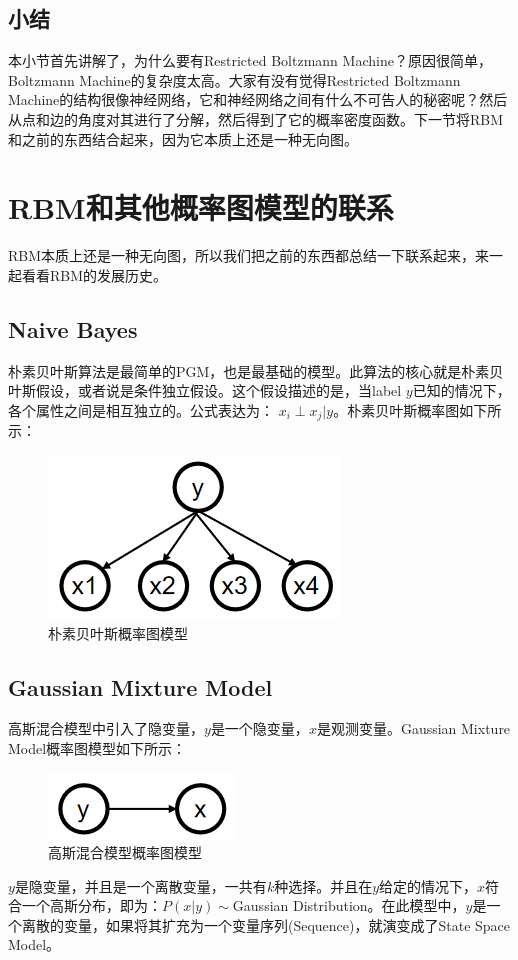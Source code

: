 \documentclass[a4paper]{article}
\begin{document}
\subsection{小结}
本小节首先讲解了，为什么要有Restricted Boltzmann Machine？原因很简单，Boltzmann Machine的复杂度太高。大家有没有觉得Restricted Boltzmann Machine的结构很像神经网络，它和神经网络之间有什么不可告人的秘密呢？然后从点和边的角度对其进行了分解，然后得到了它的概率密度函数。下一节将RBM和之前的东西结合起来，因为它本质上还是一种无向图。

\section{RBM和其他概率图模型的联系}
RBM本质上还是一种无向图，所以我们把之前的东西都总结一下联系起来，来一起看看RBM的发展历史。

\subsection{Naive Bayes}
朴素贝叶斯算法是最简单的PGM，也是最基础的模型。此算法的核心就是朴素贝叶斯假设，或者说是条件独立假设。这个假设描述的是，当label $y$已知的情况下，各个属性之间是相互独立的。公式表达为：
$x_i\perp x_j|y$。朴素贝叶斯概率图如下所示：
\begin{figure}[H]
    \centering
    \includegraphics[width=.35\textwidth]{微信图片_20200229202910.png}
    \caption{朴素贝叶斯概率图模型}
    
\end{figure}

\subsection{Gaussian Mixture Model}
高斯混合模型中引入了隐变量，$y$是一个隐变量，$x$是观测变量。Gaussian Mixture Model概率图模型如下所示：
\begin{figure}[H]
    \centering
    \includegraphics[width=.2\textwidth]{微信图片_20200229204430.png}
    \caption{高斯混合模型概率图模型}
    
\end{figure}
\noindent $y$是隐变量，并且是一个离散变量，一共有$k$种选择。并且在$y$给定的情况下，$x$符合一个高斯分布，即为：$P(x|y)\sim$Gaussian Distribution。在此模型中，$y$是一个离散的变量，如果将其扩充为一个变量序列(Sequence)，就演变成了State Space Model。
\end{document}
